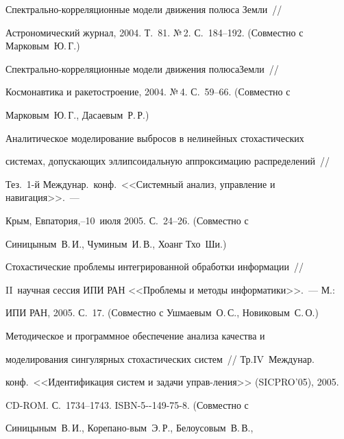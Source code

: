  Спектрально-корреляционные модели движения полюса Зем\-ли~//


Астрономический журнал, 2004. Т.~81. №\,2. С.~184--192. (Совместно с Марковым~Ю.\,Г.)





 Спектрально-корреляционные модели движения полюса\linebreak Земли~//


Космонавтика и ракетостроение, 2004. №\,4. С.~59--66. (Совместно с


Марковым~Ю.\,Г., Дасаевым~Р.\,Р.)










 Аналитическое моделирование выбросов в нелинейных стохастических


системах, допускающих эллипсоидальную аппроксимацию распределений~//


Тез.\ 1-й Междунар.\ конф.\ <<Системный анализ, управление и навигация>>.~---


Крым, Евпатория,--10~июля 2005. С.~24--26. (Совместно с


Синицыным~В.\,И., Чуминым~И.\,В., Хоанг Тхо~Ши.)





 Стохастические проблемы интегрированной обработки информации~//


II~научная сессия ИПИ РАН <<Проблемы и методы информатики>>.~--- М.:


ИПИ РАН, 2005. С.~17. (Совместно с Ушмаевым~О.\,С., Новиковым~С.\,О.)





 Методическое и программное обеспечение анализа качества и


моделирования сингулярных стохастических систем~// Тр.\linebreak IV~Междунар.\


конф.\ <<Идентификация систем и задачи управ-\linebreak ления>> (SICPRO'05), 2005.


 CD-ROM. С.~1734--1743. ISBN-5--149-75-8. (Совместно с


Синицыным~В.\,И., Корепано-\linebreak вым~Э.\,Р., Белоусовым~В.\,В.,


